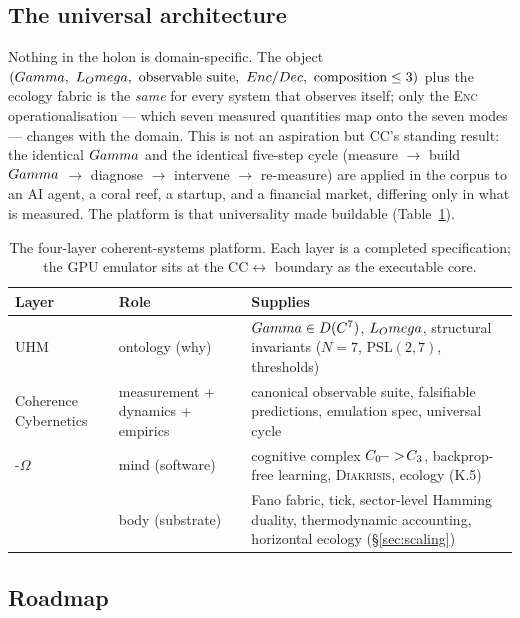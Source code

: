\subsection{The universal architecture}
\label{subsec:universal}

Nothing in the holon is domain-specific. The object
$(\Gam,\ \LindOmega,\ \text{observable suite},\ \textsc{Enc}/\textsc{Dec},\
\text{composition}\le 3)$ plus the ecology fabric is the \emph{same} for every
system that observes itself; only the \textsc{Enc} operationalisation --- which
seven measured quantities map onto the seven modes --- changes with the domain.
This is not an aspiration but CC's standing result: the identical $Gamma$ and the
identical five-step cycle (measure $\to$ build $Gamma$ $\to$ diagnose $\to$
intervene $\to$ re-measure) are applied in the corpus to an AI agent, a coral
reef, a startup, and a financial market, differing only in what is measured. The
platform is that universality made buildable (Table~\ref{tab:stack}).

\begin{table}[H]
\centering\small
\caption{The four-layer coherent-systems platform. Each layer is a completed
specification; the GPU emulator sits at the CC$\leftrightarrow$\TALOS{} boundary
as the executable core.}
\label{tab:stack}
\begin{tabular}{@{}p{2.5cm}p{4.1cm}p{5.6cm}@{}}
\toprule
\textbf{Layer} & \textbf{Role} & \textbf{Supplies} \\
\midrule
UHM & ontology (why) & $Gamma\in D(C^7)$, $L_Omega$, structural invariants ($N{=}7$, $\mathrm{PSL}(2,7)$, thresholds) \\
Coherence Cybernetics & measurement + dynamics + empirics & canonical observable suite, falsifiable predictions, emulation spec, universal cycle \\
\SYNARC{}-$\Omega$ & mind (software) & cognitive complex $C_0\!->\!C_3$, backprop-free learning, \textsc{Diakrisis}, ecology (K.5) \\
\TALOS{} & body (substrate) & Fano fabric, tick, sector-level Hamming duality, thermodynamic accounting, horizontal ecology (\S\ref{sec:scaling}) \\
\bottomrule
\end{tabular}
\end{table}

\subsection{Roadmap}
\label{subsec:roadmap}

